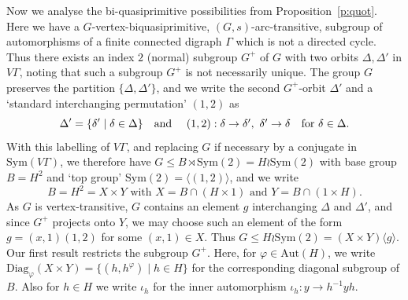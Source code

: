 \documentclass[11pt]{amsart}
\newtheorem{theorem}{Theorem}[section]
\newcommand{\Aut}{\mathrm{Aut}}
\newcommand{\Diag}{\mathrm{Diag}}
\newcommand{\Sym}{\mathrm{Sym}}
\begin{document}
Now we analyse the bi-quasiprimitive possibilities from Proposition~\ref{p:quot}. Here we have a $G$-vertex-biquasiprimitive, $(G,s)$-arc-transitive, subgroup of automorphisms of a finite connected digraph $\Gamma$ which is not a directed cycle. Thus there exists an index $2$ (normal) subgroup $G^+$ of $G$ with two orbits $\Delta, \Delta'$ in $V\Gamma$, noting that such a subgroup $G^+$ is not necessarily unique. The group $G$ preserves the partition $\{\Delta,\Delta'\}$, and we write the second $G^+$-orbit $\Delta'$ and a `standard interchanging permutation' $(1,2)$ as
\[
\Delta'=\{\delta'\mid \delta\in\Delta\}\quad \mbox{and \quad $(1,2):\delta\to \delta',\ \delta'\to \delta$\quad  for $\delta\in\Delta$.}
\]
With this labelling of $V\Gamma$, and replacing $G$ if necessary by a conjugate in $\Sym(V\Gamma)$, we therefore have $G\leqslant B\rtimes \Sym(2)=H\wr \Sym(2)$ with base group $B=H^2$ and `top group' $\Sym(2)=\langle (1,2)\rangle$, and we write  
\begin{equation}\label{pe:biqp-setup}
    \mbox{$B= H^2=X\times Y$ with $X=B\cap (H\times 1)$ and $Y=B\cap(1\times H)$.}
\end{equation}
As $G$ is vertex-transitive, $G$ contains an element $g$ interchanging $\Delta$ and $\Delta'$, and since $G^+$ projects onto $Y$, we may choose such an element of the form $g=(x,1)(1,2)$ for some $(x,1)\in X$. Thus $G\leqslant H\wr \Sym(2) = (X\times Y)\langle g\rangle$.  Our first result restricts the subgroup $G^+$. Here, for $\varphi\in\Aut(H)$, we write \(\Diag_{\varphi}(X\times Y) = \{(h, h^\varphi)\mid h\in H\}\) for the corresponding diagonal subgroup of $B$. Also for $h\in H$ we write $\iota_h$ for the inner automorphism $\iota_h:y\to h^{-1}yh$.

   
\end{document}
